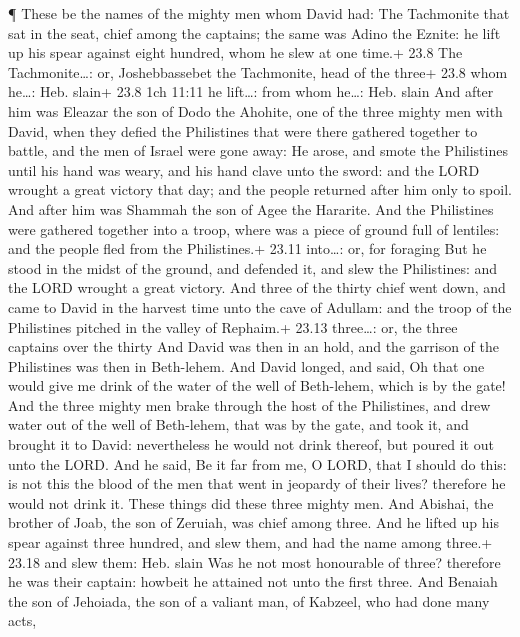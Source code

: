  ¶ These be the names of the mighty men whom David had: The
Tachmonite that sat in the seat, chief among the captains; the same was
Adino the Eznite: he lift up his spear against eight hundred, whom he
slew at one time.+ 23.8 The Tachmonite\ldots: or, Joshebbassebet the
Tachmonite, head of the three+ 23.8 whom he\ldots: Heb. slain+ 23.8 1ch
11:11 he lift\ldots: from whom he\ldots: Heb. slain  And
after him was Eleazar the son of Dodo the Ahohite, one of the three
mighty men with David, when they defied the Philistines that were there
gathered together to battle, and the men of Israel were gone away:
 He arose, and smote the Philistines until his hand was
weary, and his hand clave unto the sword: and the LORD wrought a great
victory that day; and the people returned after him only to spoil.
 And after him was Shammah the son of Agee the Hararite.
And the Philistines were gathered together into a troop, where was a
piece of ground full of lentiles: and the people fled from the
Philistines.+ 23.11 into\ldots: or, for foraging  But he
stood in the midst of the ground, and defended it, and slew the
Philistines: and the LORD wrought a great victory.  And
three of the thirty chief went down, and came to David in the harvest
time unto the cave of Adullam: and the troop of the Philistines pitched
in the valley of Rephaim.+ 23.13 three\ldots: or, the three captains
over the thirty  And David was then in an hold, and the
garrison of the Philistines was then in Beth-lehem.  And
David longed, and said, Oh that one would give me drink of the water of
the well of Beth-lehem, which is by the gate!  And the
three mighty men brake through the host of the Philistines, and drew
water out of the well of Beth-lehem, that was by the gate, and took it,
and brought it to David: nevertheless he would not drink thereof, but
poured it out unto the LORD.  And he said, Be it far from
me, O LORD, that I should do this: is not this the blood of the men that
went in jeopardy of their lives? therefore he would not drink it. These
things did these three mighty men.  And Abishai, the
brother of Joab, the son of Zeruiah, was chief among three. And he
lifted up his spear against three hundred, and slew them, and had the
name among three.+ 23.18 and slew them: Heb. slain  Was he
not most honourable of three? therefore he was their captain: howbeit he
attained not unto the first three.  And Benaiah the son of
Jehoiada, the son of a valiant man, of Kabzeel, who had done many acts,
